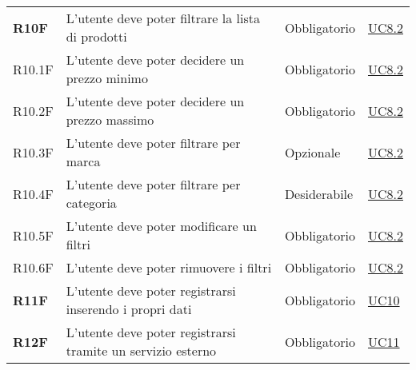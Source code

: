 \begin{center}
\begin{longtable}[!h]{p{50px} p{245px} p{75px} p{50px}}
        \textbf{R10F}                         & L'utente deve poter filtrare la lista di prodotti                                                                                  & Obbligatorio             & \hyperref[sec:UC8.2]{UC8.2}                  \\
        R10.1F                                & L'utente deve poter decidere un prezzo minimo                                                                                      & Obbligatorio             & \hyperref[sec:UC8.2]{UC8.2}                  \\
        R10.2F                                & L'utente deve poter decidere un prezzo massimo                                                                                     & Obbligatorio             & \hyperref[sec:UC8.2]{UC8.2}                  \\
        R10.3F                                & L'utente deve poter filtrare per marca                                                                                             & Opzionale                & \hyperref[sec:UC8.2]{UC8.2}                  \\
        R10.4F                                & L'utente deve poter filtrare per categoria                                                                                         & Desiderabile             & \hyperref[sec:UC8.2]{UC8.2}                  \\
        R10.5F                                & L'utente deve poter modificare un filtri                                                                                           & Obbligatorio             & \hyperref[sec:UC8.2]{UC8.2}                  \\
        R10.6F                                & L'utente deve poter rimuovere i filtri                                                                                             & Obbligatorio             & \hyperref[sec:UC8.2]{UC8.2}                  \\
        \textbf{R11F}                         & L'utente deve poter registrarsi inserendo i propri dati                                                                            & Obbligatorio             & \hyperref[sec:UC10]{UC10}                    \\
        \textbf{R12F}                         & L'utente deve poter registrarsi tramite un servizio esterno                                                                        & Obbligatorio             & \hyperref[sec:UC11]{UC11}                    \\

\end{longtable}
\end{center}
